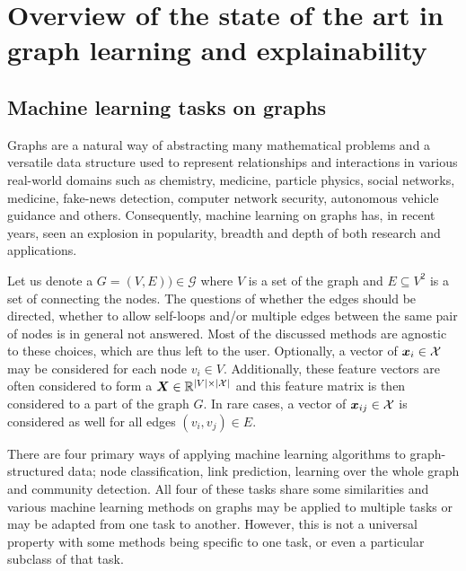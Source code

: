 \chapter{Overview of the state of the art in graph learning and explainability}
\label{chap:sota}

\section{Machine learning tasks on graphs}

Graphs are a natural way of abstracting many mathematical problems and a versatile data structure used to represent relationships and interactions in various real-world domains such as chemistry, medicine, particle physics, social networks, medicine, fake-news detection, computer network security, autonomous vehicle guidance and others. Consequently, machine learning on graphs has, in recent years, seen an explosion in popularity, breadth and depth of both research and applications.

Let us denote a  \( G = \left( V, E \right)) \in \mathcal{G} \) where \( V \) is a set of the graph  and \( E \subseteq V^2 \) is a set of  connecting the nodes. The questions of whether the edges should be directed, whether to allow self-loops and/or multiple edges between the same pair of nodes is in general not answered. Most of the discussed methods are agnostic to these choices, which are thus left to the user. Optionally, a vector of  \( \bm{x}_i \in \mathcal{X} \) may be considered for each node \( v_i \in V \). Additionally, these feature vectors are often considered to form a  \( \bm{X} \in \mathbb{R}^{\left\lvert V \right\rvert \times \left\lvert \mathcal{X} \right\rvert} \) and this feature matrix is then considered to a part of the graph \( G \). In rare cases, a vector of  \( \bm{x}_{ij} \in \mathcal{X} \) is considered as well for all edges \( \left( v_i, v_j \right) \in E \).

There are four primary ways of applying machine learning algorithms to graph-structured data; node classification, link prediction, learning over the whole graph and community detection. All four of these tasks share some similarities and various machine learning methods on graphs may be applied to multiple tasks or may be adapted from one task to another. However, this is not a universal property with some methods being specific to one task, or even a particular subclass of that task.

